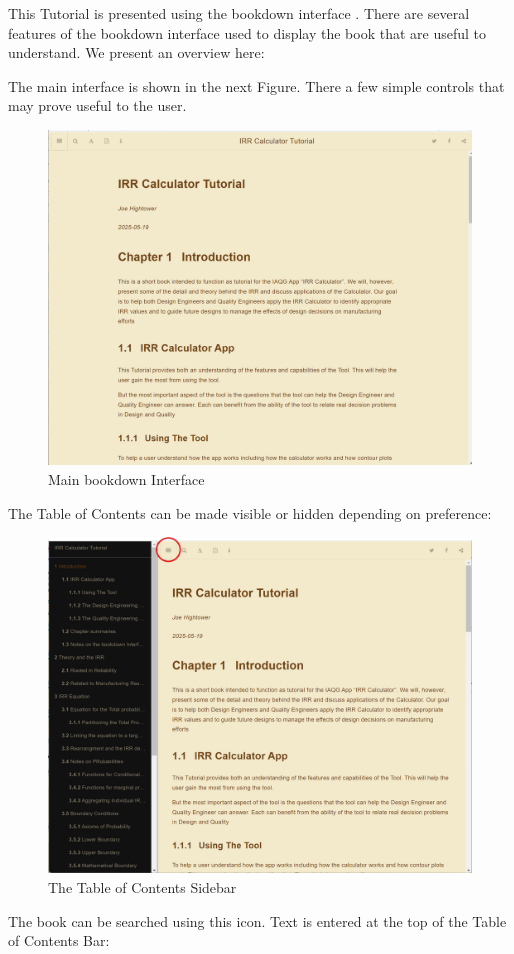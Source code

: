 \documentclass[
]{article}
\begin{document}
This Tutorial is presented using the bookdown interface \citep{R-bookdown}. There are several features of the bookdown interface used to display the book that are useful to understand. We present an overview here:

The main interface is shown in the next Figure. There a few simple controls that may prove useful to the user.

\begin{figure}

{\centering \includegraphics[width=0.5\linewidth]{Main Book Interface} 

}

\caption{Main bookdown Interface}\label{fig:unnamed-chunk-2}
\end{figure}

The Table of Contents can be made visible or hidden depending on preference:

\begin{figure}

{\centering \includegraphics[width=0.5\linewidth]{Table of Contents Sidebar} 

}

\caption{The Table of Contents Sidebar}\label{fig:unnamed-chunk-3}
\end{figure}

The book can be searched using this icon. Text is entered at the top of the Table of Contents Bar:
\end{document}
